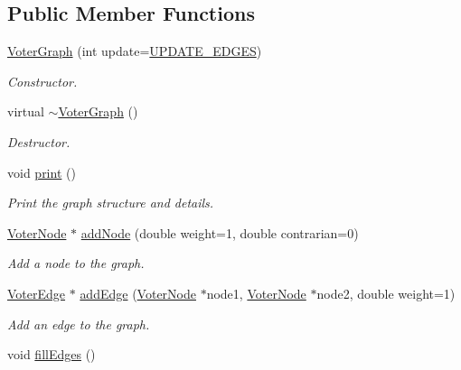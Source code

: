 \subsection*{Public Member Functions}
\begin{DoxyCompactItemize}
\item 
\hyperlink{class_voter_graph_aa5e00e0f2d2d8de10a217633d4594814}{Voter\-Graph} (int update=\hyperlink{voter__graph_8hpp_ab3bec55c359e4ed771339c8bc61fc35aa01d100088352e1a7d3a34c9a66d0f951}{U\-P\-D\-A\-T\-E\-\_\-\-E\-D\-G\-E\-S})
\begin{DoxyCompactList}\small\item\em Constructor. \end{DoxyCompactList}\item 
\hypertarget{class_voter_graph_a84a3f081c6e15cf8d1635d6ee6d5e51e}{virtual \hyperlink{class_voter_graph_a84a3f081c6e15cf8d1635d6ee6d5e51e}{$\sim$\-Voter\-Graph} ()}\label{class_voter_graph_a84a3f081c6e15cf8d1635d6ee6d5e51e}

\begin{DoxyCompactList}\small\item\em Destructor. \end{DoxyCompactList}\item 
\hypertarget{class_voter_graph_aacb7bbd4bcc7f923b2784b0bcefcd1a3}{void \hyperlink{class_voter_graph_aacb7bbd4bcc7f923b2784b0bcefcd1a3}{print} ()}\label{class_voter_graph_aacb7bbd4bcc7f923b2784b0bcefcd1a3}

\begin{DoxyCompactList}\small\item\em Print the graph structure and details. \end{DoxyCompactList}\item 
\hyperlink{class_voter_node}{Voter\-Node} $\ast$ \hyperlink{class_voter_graph_af53017970f3ac08838b67f4a09171b92}{add\-Node} (double weight=1, double contrarian=0)
\begin{DoxyCompactList}\small\item\em Add a node to the graph. \end{DoxyCompactList}\item 
\hyperlink{class_voter_edge}{Voter\-Edge} $\ast$ \hyperlink{class_voter_graph_a1f6b8be82800577c45908102251f1e35}{add\-Edge} (\hyperlink{class_voter_node}{Voter\-Node} $\ast$node1, \hyperlink{class_voter_node}{Voter\-Node} $\ast$node2, double weight=1)
\begin{DoxyCompactList}\small\item\em Add an edge to the graph. \end{DoxyCompactList}\item 
\hypertarget{class_voter_graph_aa86a23e7d5984c3c6bbea76f193b73ae}{void \hyperlink{class_voter_graph_aa86a23e7d5984c3c6bbea76f193b73ae}{fill\-Edges} ()}\label{class_voter_graph_aa86a23e7d5984c3c6bbea76f193b73ae}


\end{DoxyCompactItemize}
